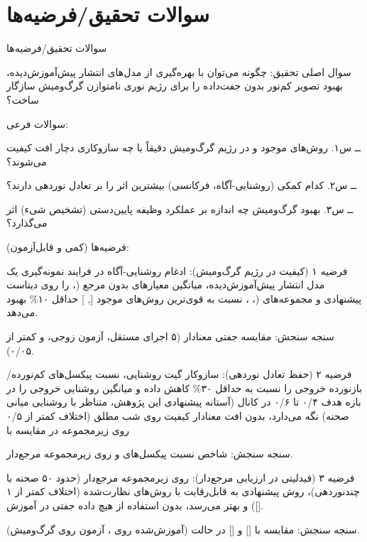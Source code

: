 \documentclass[12pt,a4paper]{article}
\begin{document}
\section{سوالات تحقیق/فرضیه‌ها}
سوالات تحقیق/فرضیه‌ها\par
سوال اصلی تحقیق: چگونه می‌توان با بهره‌گیری از  مدل‌های انتشار پیش‌آموزش‌دیده، بهبود تصویر کم‌نور بدون جفت‌داده را برای رژیم نوری نامتوازن گرگ‌ومیش سازگار ساخت؟\par
سوالات فرعی:\par
ــ س۱. روش‌های موجود  و  در رژیم گرگ‌ومیش دقیقاً با چه سازوکاری دچار افت کیفیت می‌شوند؟\par
ــ س۲. کدام  کمکی (روشنایی-آگاه، فرکانسی) بیشترین اثر را بر تعادل نوردهی دارند؟\par
ــ س۳. بهبود گرگ‌ومیش چه اندازه بر عملکرد وظیفه پایین‌دستی (تشخیص شیء) اثر می‌گذارد؟\par
فرضیه‌ها (کمی و قابل‌آزمون):\par
فرضیه ۱ (کیفیت در رژیم گرگ‌ومیش): ادغام  روشنایی-آگاه در فرایند نمونه‌گیری یک مدل انتشار پیش‌آموزش‌دیده، میانگین معیارهای بدون مرجع (،  را روی دیتاست پیشنهادی  و مجموعه‌های  (، ،  نسبت به قوی‌ترین روش‌های  موجود [, ] حداقل ۱۰\% بهبود می‌دهد.\par
سنجه سنجش: مقایسه جفتی معنادار (۵ اجرای مستقل، آزمون  زوجی، و  کمتر از ۰/۰۵).\par
فرضیه ۲ (حفظ تعادل نوردهی): سازوکار گیت روشنایی، نسبت پیکسل‌های کم‌نورده/بازنورده خروجی را نسبت به  حداقل ۳۰\% کاهش داده و میانگین روشنایی خروجی را در بازه هدف ۰/۴ تا ۰/۶ در کانال  (آستانه پیشنهادی این پژوهش، متناظر با روشنایی میانی صحنه) نگه می‌دارد، بدون افت معنادار کیفیت روی شب مطلق (اختلاف  کمتر از ۰/۵  روی زیرمجموعه  در مقایسه با \par
سنجه سنجش: شاخص نسبت پیکسل‌های  و  روی زیرمجموعه مرجع‌دار.\par
فرضیه ۳ (فیدلیتی در ارزیابی مرجع‌دار): روی زیرمجموعه مرجع‌دار  (حدود ۵۰ صحنه با چندنوردهی)، روش پیشنهادی به  قابل‌رقابت با روش‌های نظارت‌شده  (اختلاف کمتر از ۱  []) و  بهتر می‌رسد، بدون استفاده از هیچ داده جفتی در آموزش.\par
سنجه سنجش: مقایسه با  [] و  [] در حالت  (آموزش‌شده روی ، آزمون روی گرگ‌ومیش).\par
\end{document}

